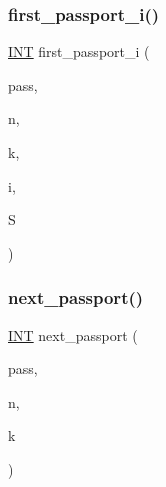 \subsubsection{\texorpdfstring{first\+\_\+passport\+\_\+i()}{first\_passport\_i()}}
{\footnotesize\ttfamily \mbox{\hyperlink{galois_8h_a09fddde158a3a20bd2dcadb609de11dc}{I\+NT}} first\+\_\+passport\+\_\+i (\begin{DoxyParamCaption}\item[{\mbox{\hyperlink{class_vector}{Vector}} \&}]{pass,  }\item[{\mbox{\hyperlink{galois_8h_a09fddde158a3a20bd2dcadb609de11dc}{I\+NT}}}]{n,  }\item[{\mbox{\hyperlink{galois_8h_a09fddde158a3a20bd2dcadb609de11dc}{I\+NT}}}]{k,  }\item[{\mbox{\hyperlink{galois_8h_a09fddde158a3a20bd2dcadb609de11dc}{I\+NT}}}]{i,  }\item[{\mbox{\hyperlink{galois_8h_a09fddde158a3a20bd2dcadb609de11dc}{I\+NT}} \&}]{S }\end{DoxyParamCaption})}

\mbox{\label{number__partition_8_c_aa1dae9a588e3f2fb6c230a5a4d338d9f}} 
\subsubsection{\texorpdfstring{next\+\_\+passport()}{next\_passport()}}
{\footnotesize\ttfamily \mbox{\hyperlink{galois_8h_a09fddde158a3a20bd2dcadb609de11dc}{I\+NT}} next\+\_\+passport (\begin{DoxyParamCaption}\item[{\mbox{\hyperlink{class_vector}{Vector}} \&}]{pass,  }\item[{\mbox{\hyperlink{galois_8h_a09fddde158a3a20bd2dcadb609de11dc}{I\+NT}}}]{n,  }\item[{\mbox{\hyperlink{galois_8h_a09fddde158a3a20bd2dcadb609de11dc}{I\+NT}}}]{k }\end{DoxyParamCaption})}

\mbox{\label{number__partition_8_c_a9f22020a31cc9ad379f8a224896c8472}} 
